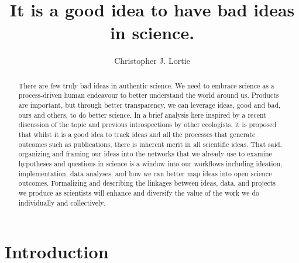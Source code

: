 \documentclass[]{elsarticle} %
\begin{document}
\begin{frontmatter}

  \title{It is a good idea to have bad ideas in science.}
    \author[York University and NCEAS, UCSB]{Christopher J. Lortie}
      \address[York University]{Biology, 4700 Keele St, Toronto, ON, Canada.}
  
  \begin{abstract}
  There are few truly bad ideas in authentic science. We need to embrace
  science as a process-driven human endeavour to better understand the
  world around us. Products are important, but through better
  transparency, we can leverage ideas, good and bad, ours and others, to
  do better science. In a brief analysis here inspired by a recent
  discussion of the topic and previous introspections by other ecologists,
  it is proposed that whilst it is a good idea to track ideas and all the
  processes that generate outcomes such as publications, there is inherent
  merit in all scientific ideas. That said, organizing and framing our
  ideas into the networks that we already use to examine hypotheses and
  questions in science is a window into our workflows including ideation,
  implementation, data analyses, and how we can better map ideas into open
  science outcomes. Formalizing and describing the linkages between ideas,
  data, and projects we produce as scientists will enhance and diversify
  the value of the work we do individually and collectively.
  \end{abstract}
  
 \end{frontmatter}

\section{Introduction}\label{introduction}
\end{document}
